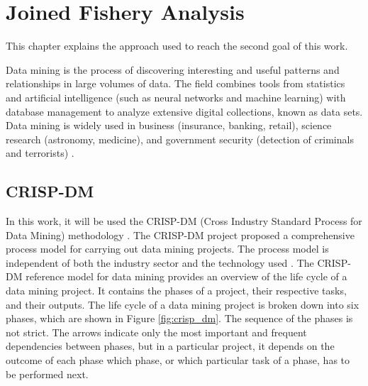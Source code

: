 % 
% 
%
\chapter{Joined Fishery Analysis}
\label{cha:server}
This chapter explains the approach used to reach the second goal of this work. 


Data mining is the process of discovering interesting and useful patterns and relationships in large volumes of data. The field combines tools from statistics and artificial intelligence (such as neural networks and machine learning) with database management to analyze extensive digital collections, known as data sets. Data mining is widely used in business (insurance, banking, retail), science research (astronomy, medicine), and government security (detection of criminals and terrorists) \cite{Okonkwo2011COMBATINGCA}. 

\section{CRISP-DM} %
\label{sub:crisp_dm}

In this work, it will be used the CRISP-DM (Cross Industry Standard Process for Data Mining) methodology \cite{CRISPDM}.
The CRISP-DM project proposed a comprehensive process model for carrying out data mining projects. The process model is independent of both the industry sector and the technology used \cite{CRISPDM}. 
The CRISP-DM reference model for data mining provides an overview of the life cycle of a data
mining project. It contains the phases of a project, their respective tasks, and their outputs.
The life cycle of a data mining project is broken down into six phases, which are shown in Figure \ref{fig:crisp_dm}.
The sequence of the phases is not strict. The arrows indicate only the most important and frequent
dependencies between phases, but in a particular project, it depends on the outcome of each phase
which phase, or which particular task of a phase, has to be performed next.


